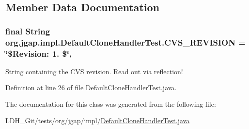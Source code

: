 \subsection{Member Data Documentation}
\hypertarget{classorg_1_1jgap_1_1impl_1_1_default_clone_handler_test_af84ba084e8a7e037f0d2382819534410}{
\subsubsection[{C\-V\-S\-\_\-\-R\-E\-V\-I\-S\-I\-O\-N}]{\setlength{\rightskip}{0pt plus 5cm}final String org.\-jgap.\-impl.\-Default\-Clone\-Handler\-Test.\-C\-V\-S\-\_\-\-R\-E\-V\-I\-S\-I\-O\-N = \char`\"{}\$Revision\-: 1. \$\char`\"{}\hspace{0.3cm}{\ttfamily [static]}, {\ttfamily [private]}}}\label{classorg_1_1jgap_1_1impl_1_1_default_clone_handler_test_af84ba084e8a7e037f0d2382819534410}
String containing the C\-V\-S revision. Read out via reflection! 

Definition at line 26 of file Default\-Clone\-Handler\-Test.\-java.



The documentation for this class was generated from the following file\-:\begin{DoxyCompactItemize}
\item 
L\-D\-H\-\_\-\-Git/tests/org/jgap/impl/\hyperlink{_default_clone_handler_test_8java}{Default\-Clone\-Handler\-Test.\-java}\end{DoxyCompactItemize}

